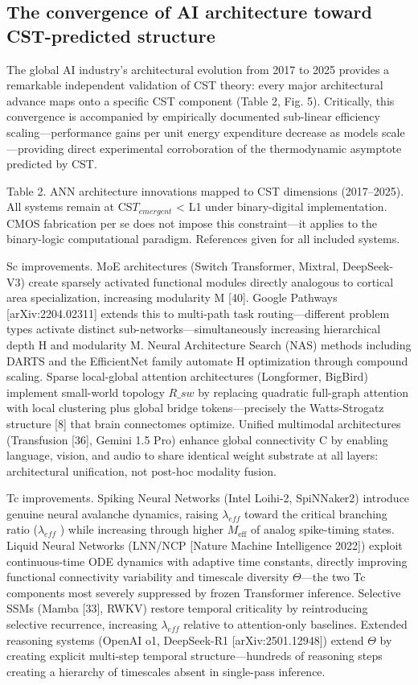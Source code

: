 \documentclass[a4paper,12pt]{article}
\begin{document}
\subsection{The convergence of AI architecture toward CST-predicted structure}

The global AI industry's architectural evolution from 2017 to 2025 provides a remarkable independent validation of CST theory: every major architectural advance maps onto a specific CST component (Table 2, Fig. 5). Critically, this convergence is accompanied by empirically documented sub-linear efficiency scaling---performance gains per unit energy expenditure decrease as models scale---providing direct experimental corroboration of the thermodynamic asymptote predicted by CST.

Table 2. ANN architecture innovations mapped to CST dimensions (2017--2025). All systems remain at CS$T_{emergent}$ < L1 under binary-digital implementation. CMOS fabrication per se does not impose this constraint---it applies to the binary-logic computational paradigm. References given for all included systems.

Sc improvements.
MoE architectures (Switch Transformer, Mixtral, DeepSeek-V3) create sparsely activated functional modules directly analogous to cortical area specialization, increasing modularity M [40].
Google Pathways [arXiv:2204.02311] extends this to multi-path task routing---different problem types activate distinct sub-networks---simultaneously increasing hierarchical depth H and modularity M.
Neural Architecture Search (NAS) methods including DARTS and the EfficientNet family automate H optimization through compound scaling.
Sparse local-global attention architectures (Longformer, BigBird) implement small-world topology $R\_{sw}$ by replacing quadratic full-graph attention with local clustering plus global bridge tokens---precisely the Watts-Strogatz structure [8] that brain connectomes optimize.
Unified multimodal architectures (Transfusion [36], Gemini 1.5 Pro) enhance global connectivity C by enabling language, vision, and audio to share identical weight substrate at all layers: architectural unification, not post-hoc modality fusion.

Tc improvements.
Spiking Neural Networks (Intel Loihi-2, SpiNNaker2) introduce genuine neural avalanche dynamics, raising $\lambda_{eff}$ toward the critical branching ratio ($\lambda_{eff}$  ) while increasing  \alpha  through higher $M_{\text{eff}}$ of analog spike-timing states.
Liquid Neural Networks (LNN/NCP [Nature Machine Intelligence 2022]) exploit continuous-time ODE dynamics with adaptive time constants, directly improving functional connectivity variability  \Psi  and timescale diversity $\Theta$---the two Tc components most severely suppressed by frozen Transformer inference.
Selective SSMs (Mamba [33], RWKV) restore temporal criticality by reintroducing selective recurrence, increasing $\lambda_{eff}$ relative to attention-only baselines.
Extended reasoning systems (OpenAI o1, DeepSeek-R1 [arXiv:2501.12948]) extend $\Theta$ by creating explicit multi-step temporal structure---hundreds of reasoning steps creating a hierarchy of timescales absent in single-pass inference.
\end{document}
